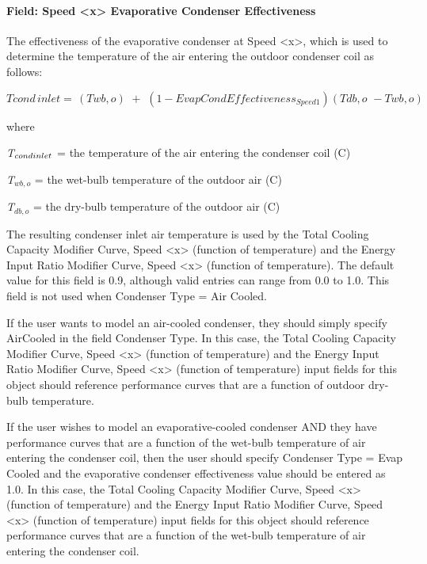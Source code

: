 \paragraph{Field: Speed \textless{}x\textgreater{} Evaporative Condenser Effectiveness}\label{field-speed-x-evaporative-condenser-effectiveness}

The effectiveness of the evaporative condenser at Speed \textless{}x\textgreater{}, which is used to determine the temperature of the air entering the outdoor condenser coil as follows:

\begin{equation}
Tcond\,inlet = \,\left( {Twb,o} \right)\,\, + \,\,\left( {1 - EvapCondEffectivenes{s_{Speed1}}} \right)\left( {Tdb,o\,\, - Twb,o} \right)
\end{equation}

where

\emph{T\(_{cond\\ inlet}\)} = the temperature of the air entering the condenser coil (C)

\emph{T\(_{wb,o}\)} = the wet-bulb temperature of the outdoor air (C)

\emph{T\(_{db,o}\)} = the dry-bulb temperature of the outdoor air (C)

The resulting condenser inlet air temperature is used by the Total Cooling Capacity Modifier Curve, Speed \textless{}x\textgreater{} (function of temperature) and the Energy Input Ratio Modifier Curve, Speed \textless{}x\textgreater{} (function of temperature). The default value for this field is 0.9, although valid entries can range from 0.0 to 1.0. This field is not used when Condenser Type = Air Cooled.

If the user wants to model an air-cooled condenser, they should simply specify AirCooled in the field Condenser Type. In this case, the Total Cooling Capacity Modifier Curve, Speed \textless{}x\textgreater{} (function of temperature) and the Energy Input Ratio Modifier Curve, Speed \textless{}x\textgreater{} (function of temperature) input fields for this object should reference performance curves that are a function of outdoor dry-bulb temperature.

If the user wishes to model an evaporative-cooled condenser AND they have performance curves that are a function of the wet-bulb temperature of air entering the condenser coil, then the user should specify Condenser Type = Evap Cooled and the evaporative condenser effectiveness value should be entered as 1.0. In this case, the Total Cooling Capacity Modifier Curve, Speed \textless{}x\textgreater{} (function of temperature) and the Energy Input Ratio Modifier Curve, Speed \textless{}x\textgreater{} (function of temperature) input fields for this object should reference performance curves that are a function of the wet-bulb temperature of air entering the condenser coil.

